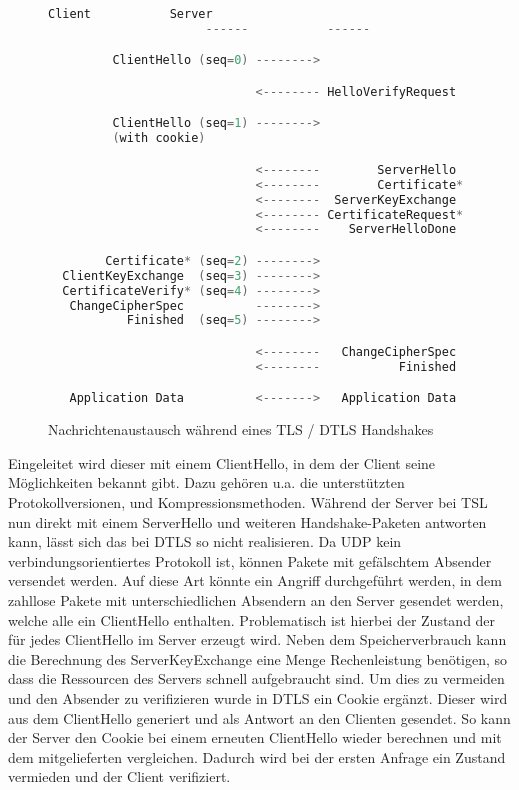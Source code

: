\begin{figure}[ht]
  \centering
  \begin{lstlisting}[language=c]
                      Client           Server
                      ------           ------

         ClientHello (seq=0) -------->

                             <-------- HelloVerifyRequest  (seq=0)    // Nur bei DTLS

         ClientHello (seq=1) -------->                                // Nur bei DTLS
         (with cookie)                                                // Nur bei DTLS

                             <--------        ServerHello  (seq=1)
                             <--------        Certificate* (seq=2)
                             <--------  ServerKeyExchange  (seq=3)
                             <-------- CertificateRequest* (seq=4)
                             <--------    ServerHelloDone  (seq=5)

        Certificate* (seq=2) -------->
  ClientKeyExchange  (seq=3) -------->
  CertificateVerify* (seq=4) -------->
   ChangeCipherSpec          -------->
           Finished  (seq=5) -------->

                             <--------   ChangeCipherSpec
                             <--------           Finished  (seq=6)

   Application Data          <------->   Application Data
  \end{lstlisting}
  \caption{Nachrichtenaustausch während eines TLS / DTLS Handshakes}
  \label{fig:handshake}
\end{figure}

Eingeleitet wird dieser mit einem ClientHello, in dem der Client seine Möglichkeiten bekannt gibt. Dazu gehören u.a. die unterstützten Protokollversionen, 
und Kompressionsmethoden. Während der Server bei TSL nun direkt mit einem ServerHello und weiteren Handshake-Paketen antworten kann, lässt sich das bei DTLS so nicht
realisieren. Da UDP kein verbindungsorientiertes Protokoll ist, können Pakete mit gefälschtem Absender versendet werden. Auf diese Art könnte ein  Angriff
durchgeführt werden, in dem zahllose Pakete mit unterschiedlichen Absendern an den Server gesendet werden, welche alle ein ClientHello enthalten. Problematisch ist
hierbei der Zustand der für jedes ClientHello im Server erzeugt wird. Neben dem Speicherverbrauch kann die Berechnung des ServerKeyExchange eine Menge Rechenleistung
benötigen, so dass die Ressourcen des Servers schnell aufgebraucht sind. Um dies zu vermeiden und den Absender zu verifizieren wurde in DTLS ein Cookie ergänzt.
Dieser wird aus dem ClientHello generiert und als Antwort an den Clienten gesendet. So kann der Server den Cookie bei einem erneuten ClientHello wieder berechnen
und mit dem mitgelieferten vergleichen. Dadurch wird bei der ersten Anfrage ein Zustand vermieden und der Client verifiziert.

